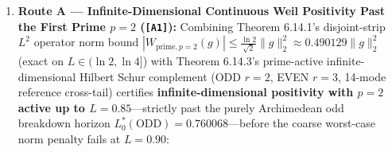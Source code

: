 \documentclass[
  11pt,
]{article}
\begin{document}
\begin{enumerate}
\def\labelenumi{\arabic{enumi}.}
\item
  \textbf{Route A --- Infinite-Dimensional Continuous Weil Positivity
  Past the First Prime \(p = 2\) (\texttt{{[}A1{]}}):} Combining Theorem
  6.14.1's disjoint-strip \(L^2\) operator norm bound
  \(|W_{\text{prime}, p=2}(g)| \le \frac{\ln 2}{\sqrt{2}}\|g\|_2^2 \approx 0.490129\|g\|_2^2\)
  (exact on \(L \in (\ln 2, \ln 4]\)) with Theorem 6.14.3's prime-active
  infinite-dimensional Hilbert Schur complement (ODD \(r = 2\), EVEN
  \(r = 3\), 14-mode reference cross-tail) certifies
  \textbf{infinite-dimensional positivity with \(p = 2\) active up to
  \(L = 0.85\)}---strictly past the purely Archimedean odd breakdown
  horizon \(L_0^*(\text{ODD}) = 0.760068\)---before the coarse
  worst-case norm penalty fails at \(L = 0.90\):


\end{enumerate}
\end{document}
